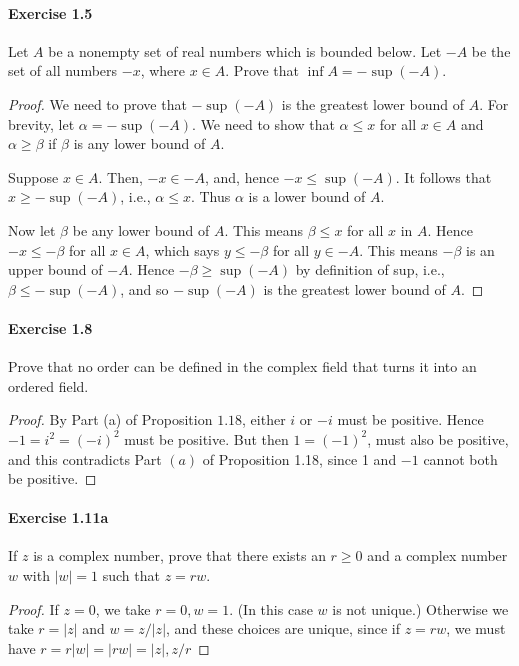 \documentclass{article}
\theoremstyle{definition}
\begin{document}
\paragraph{Exercise 1.5} Let $A$ be a nonempty set of real numbers which is bounded below. Let $-A$ be the set of all numbers $-x$, where $x \in A$. Prove that $\inf A=-\sup (-A)$.
\begin{proof}
    We need to prove that $-\sup (-A)$ is the greatest lower bound of $A$. For brevity, let $\alpha=-\sup (-A)$. We need to show that $\alpha \leq x$ for all $x \in A$ and $\alpha \geq \beta$ if $\beta$ is any lower bound of $A$.

Suppose $x \in A$. Then, $-x \in-A$, and, hence $-x \leq \sup (-A)$. It follows that $x \geq-\sup (-A)$, i.e., $\alpha \leq x$. Thus $\alpha$ is a lower bound of $A$.

Now let $\beta$ be any lower bound of $A$. This means $\beta \leq x$ for all $x$ in $A$. Hence $-x \leq-\beta$ for all $x \in A$, which says $y \leq-\beta$ for all $y \in-A$. This means $-\beta$ is an upper bound of $-A$. Hence $-\beta \geq \sup (-A)$ by definition of sup, i.e., $\beta \leq-\sup (-A)$, and so $-\sup (-A)$ is the greatest lower bound of $A$.
\end{proof}


\paragraph{Exercise 1.8} Prove that no order can be defined in the complex field that turns it into an ordered field.
\begin{proof}
    By Part (a) of Proposition $1.18$, either $i$ or $-i$ must be positive. Hence $-1=i^2=(-i)^2$ must be positive. But then $1=(-1)^2$, must also be positive, and this contradicts Part $(a)$ of Proposition 1.18, since 1 and $-1$ cannot both be positive.
\end{proof}


\paragraph{Exercise 1.11a} If $z$ is a complex number, prove that there exists an $r\geq 0$ and a complex number $w$ with $| w | = 1$ such that $z = rw$.
\begin{proof}
    If $z=0$, we take $r=0, w=1$. (In this case $w$ is not unique.) Otherwise we take $r=|z|$ and $w=z /|z|$, and these choices are unique, since if $z=r w$, we must have $r=r|w|=|r w|=|z|, z / r$
\end{proof}
\end{document}
